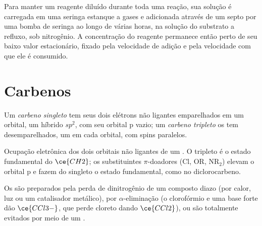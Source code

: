 \begin{inthelab}
Para manter um reagente diluído durante toda uma reação, sua solução é carregada em uma
seringa estanque a gases e adicionada através de um septo por uma bomba de seringa ao longo de várias
horas, na solução do substrato a refluxo, sob nitrogênio. A
concentração do reagente permanece então perto de seu baixo valor estacionário, fixado pela
velocidade de adição e pela velocidade com que ele é consumido.
\end{inthelab}

\section{Carbenos}

\begin{definition}\label{def:b3:radicals-carbenes:carbene-states}
Um \emph{carbeno singleto} tem seus dois elétrons não ligantes
emparelhados em um orbital, um híbrido $sp^2$, com seu orbital p vazio; um
\emph{carbeno tripleto} os tem desemparelhados, um em cada
orbital, com spins paralelos.
\end{definition}

\begin{omfigure}

{\small Ocupação eletrônica dos dois orbitais não ligantes de um . O
tripleto é o estado fundamental do $\ce{CH2}$; os substituintes $\pi$-doadores (Cl, OR, $\mathrm{NR_2}$) elevam o
orbital p e fazem do singleto o estado fundamental, como no diclorocarbeno.}
\end{omfigure}

Os  são preparados pela perda de dinitrogênio de um composto diazo (por calor, luz
ou um catalisador metálico), por $\alpha$-eliminação (o clorofórmio e uma base forte dão
$\ce{CCl3-}$, que perde cloreto dando $\ce{CCl2}$), ou são totalmente evitados por meio de um
.

